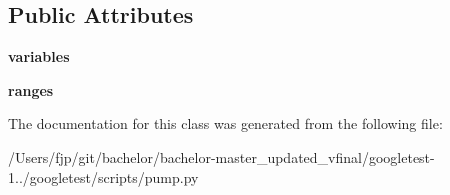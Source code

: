 \subsection*{Public Attributes}
\begin{DoxyCompactItemize}
\item 
\mbox{\label{classpump_1_1_env_aba6456f3d0d23ac92bc9508c1b966bcd}} 
{\bfseries variables}
\item 
\mbox{\label{classpump_1_1_env_a8d5fec087c1a9108de9b105922b34309}} 
{\bfseries ranges}
\end{DoxyCompactItemize}


The documentation for this class was generated from the following file\+:\begin{DoxyCompactItemize}
\item 
/\+Users/fjp/git/bachelor/bachelor-\/master\+\_\+updated\+\_\+vfinal/googletest-\/1../googletest/scripts/pump.\+py\end{DoxyCompactItemize}
